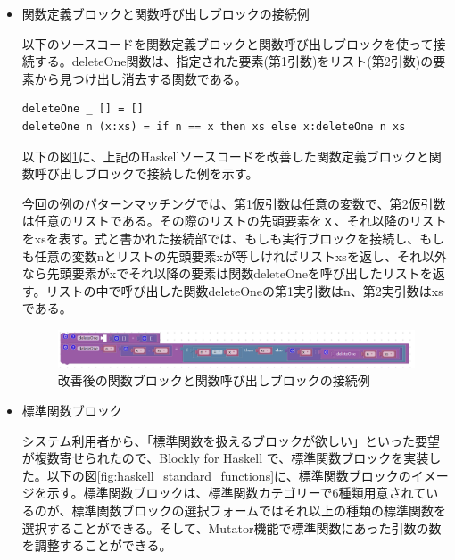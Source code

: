 \documentclass{risepaper}
\begin{document}
\begin{itemize}
\item 関数定義ブロックと関数呼び出しブロックの接続例

以下のソースコードを関数定義ブロックと関数呼び出しブロックを使って接続する。deleteOne関数は、指定された要素(第1引数)をリスト(第2引数)の要素から見つけ出し消去する関数である。
\begin{lstlisting}[basicstyle=\ttfamily\footnotesize]
deleteOne _ [] = []
deleteOne n (x:xs) = if n == x then xs else x:deleteOne n xs
\end{lstlisting}

以下の図\ref{fig:haskell_function_example}に、上記のHaskellソースコードを改善した関数定義ブロックと関数呼び出しブロックで接続した例を示す。

今回の例のパターンマッチングでは、第1仮引数は任意の変数で、第2仮引数は任意のリストである。その際のリストの先頭要素をｘ、それ以降のリストをxsを表す。式と書かれた接続部では、もしも実行ブロックを接続し、もしも任意の変数nとリストの先頭要素xが等しければリストxsを返し、それ以外なら先頭要素がxでそれ以降の要素は関数deleteOneを呼び出したリストを返す。リストの中で呼び出した関数deleteOneの第1実引数はn、第2実引数はxsである。

\begin{figure}[h]
\begin{center}
\includegraphics[scale=0.5]{img/haskell_function_example.PNG}
\caption{改善後の関数ブロックと関数呼び出しブロックの接続例}%
\label{fig:haskell_function_example}
\end{center}%
\end{figure}%

\item 標準関数ブロック

システム利用者から、「標準関数を扱えるブロックが欲しい」といった要望が複数寄せられたので、Blockly for Haskell で、標準関数ブロックを実装した。以下の図\ref{fig:haskell_standard_functions}に、標準関数ブロックのイメージを示す。標準関数ブロックは、標準関数カテゴリーで6種類用意されているのが、標準関数ブロックの選択フォームではそれ以上の種類の標準関数を選択することができる。そして、Mutator機能で標準関数にあった引数の数を調整することができる。


\end{itemize}
\end{document}
